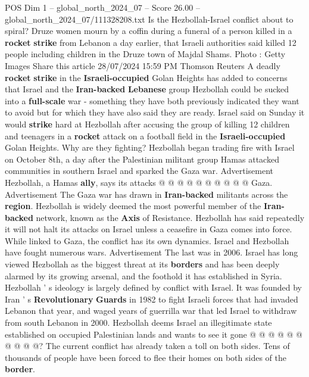 \begin{textsample}{POS Dim 1 – global\_north\_2024\_07 – Score 26.00 – global\_north\_2024\_07/111328208.txt}  \label{ex:f1_pos_182}
Is the Hezbollah-Israel conflict about to spiral?
Druze women mourn by a coffin during a funeral of a person killed in a \textbf{rocket} \textbf{strike} from Lebanon a day earlier, that Israeli authorities said killed 12 people including children in the Druze town of Majdal Shams.
Photo : Getty Images Share this article 28/07/2024 15:59 PM Thomson Reuters A deadly \textbf{rocket} \textbf{strike} in the \textbf{Israeli-occupied} Golan Heights has added to concerns that Israel and the \textbf{Iran-backed} \textbf{Lebanese} group Hezbollah could be sucked into a \textbf{full-scale} war - something they have both previously indicated they want to avoid but for which they have also said they are ready.
Israel said on Sunday it would \textbf{strike} hard at Hezbollah after accusing the group of killing 12 children and teenagers in a \textbf{rocket} attack on a football field in the \textbf{Israeli-occupied} Golan Heights.
Why are they fighting?
Hezbollah began trading fire with Israel on October 8th, a day after the Palestinian militant group Hamas attacked communities in southern Israel and sparked the Gaza war.
Advertisement Hezbollah, a Hamas \textbf{ally}, says its attacks @ @ @ @ @ @ @ @ @ @ Gaza.
Advertisement The Gaza war has drawn in \textbf{Iran-backed} militants across the \textbf{region}.
Hezbollah is widely deemed the most powerful member of the \textbf{Iran-backed} network, known as the \textbf{Axis} of Resistance.
Hezbollah has said repeatedly it will not halt its attacks on Israel unless a ceasefire in Gaza comes into force.
While linked to Gaza, the conflict has its own dynamics.
Israel and Hezbollah have fought numerous wars.
Advertisement The last was in 2006.
Israel has long viewed Hezbollah as the biggest threat at its \textbf{borders} and has been deeply alarmed by its growing arsenal, and the foothold it has established in Syria.
Hezbollah ' s ideology is largely defined by conflict with Israel.
It was founded by Iran ' s \textbf{Revolutionary} \textbf{Guards} in 1982 to fight Israeli forces that had invaded Lebanon that year, and waged years of guerrilla war that led Israel to withdraw from south Lebanon in 2000.
Hezbollah deems Israel an illegitimate state established on occupied Palestinian lands and wants to see it gone @ @ @ @ @ @ @ @ @ @?
The current conflict has already taken a toll on both sides.
Tens of thousands of people have been forced to flee their homes on both sides of the \textbf{border}.

\end{textsample}
